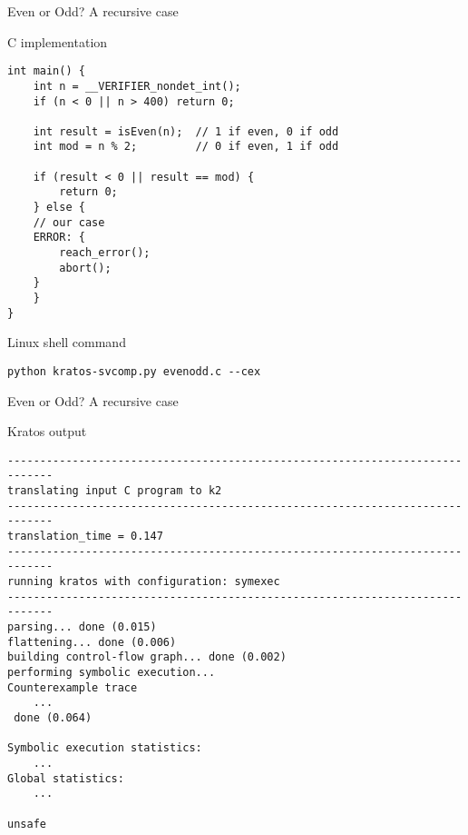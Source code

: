 \begin{frame}[fragile]{Even or Odd? A recursive case}
    \begin{block}{C implementation}
            \begin{verbatim}
int main() {
    int n = __VERIFIER_nondet_int();
    if (n < 0 || n > 400) return 0;

    int result = isEven(n);  // 1 if even, 0 if odd
    int mod = n % 2;         // 0 if even, 1 if odd

    if (result < 0 || result == mod) {
        return 0;
    } else {
    // our case
    ERROR: {
        reach_error();
        abort();
    }
    }
}
            \end{verbatim}
    \end{block}

    \pause

    \begin{block}{Linux shell command}
            \begin{verbatim}
python kratos-svcomp.py evenodd.c --cex
            \end{verbatim}
    \end{block}
\end{frame}

\begin{frame}[fragile]{Even or Odd? A recursive case}
    \begin{block}{Kratos output}
            \begin{verbatim}
-----------------------------------------------------------------------------
translating input C program to k2
-----------------------------------------------------------------------------
translation_time = 0.147
-----------------------------------------------------------------------------
running kratos with configuration: symexec
-----------------------------------------------------------------------------
parsing... done (0.015)
flattening... done (0.006)
building control-flow graph... done (0.002)
performing symbolic execution...
Counterexample trace
    ...
 done (0.064)

Symbolic execution statistics:
    ...
Global statistics:
    ...

unsafe
            \end{verbatim}
    \end{block}
\end{frame}

